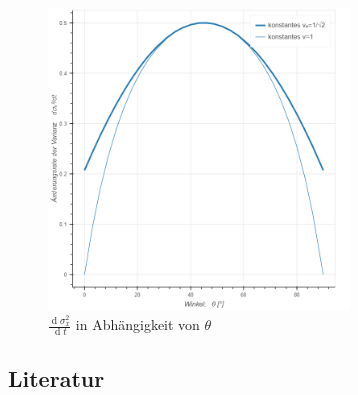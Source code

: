 \documentclass[a4paper,12pt,ngerman]{scrartcl}
\theoremstyle{plain}
\theoremstyle{plain}
\theoremstyle{plain}
\theoremstyle{plain}
\begin{document}
\begin{figure}[h]
\centering
\includegraphics[width=8cm]{varianz-winkel.png}
\caption{$\frac{\operatorname{d}\sigma_x^2}{\operatorname{d}t}$ in Abhängigkeit von $\theta$}
\label{fig_variance_angle}
\end{figure}

\subsection{Literatur}
\end{document}
